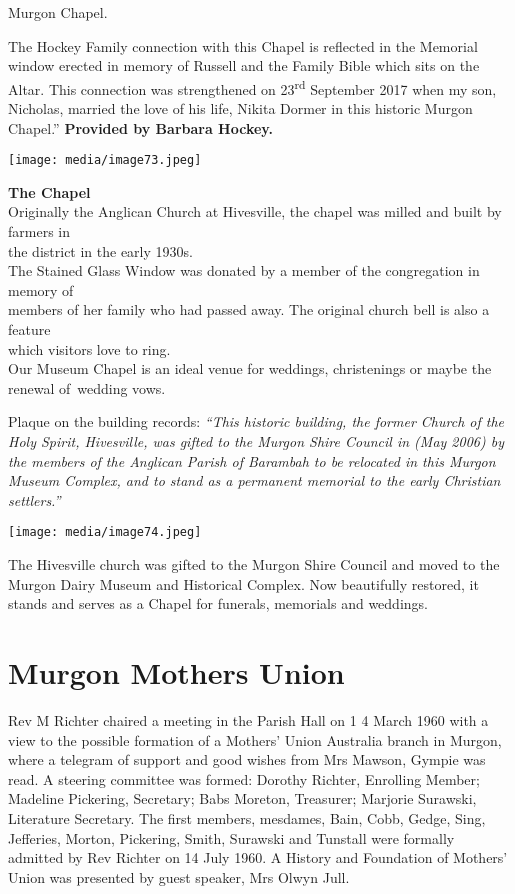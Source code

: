 Murgon Chapel.

The Hockey Family connection with this Chapel is reflected in the Memorial window erected in memory of Russell and the Family Bible which sits on the Altar. This connection was strengthened on 23\textsuperscript{rd} September 2017 when my son, Nicholas, married the love of his life, Nikita Dormer in this historic Murgon Chapel.'' \textbf{Provided by Barbara Hockey.}

\texttt{[image: media/image73.jpeg]}

\textbf{The Chapel}\\
Originally the Anglican Church at Hivesville, the chapel was milled and built by farmers in\\
the district in the early 1930s.\\
The Stained Glass Window was donated by a member of the congregation in memory of\\
members of her family who had passed away. The original church bell is also a feature\\
which visitors love to ring.\\
Our Museum Chapel is an ideal venue for weddings, christenings or maybe the renewal of~wedding vows.

Plaque on the building records: \emph{``This historic building, the former Church of the Holy Spirit, Hivesville, was gifted to the Murgon Shire Council in (May 2006) by the members of the Anglican Parish of Barambah to be relocated in this Murgon Museum Complex, and to stand as a permanent memorial to the early Christian settlers.''}

\texttt{[image: media/image74.jpeg]}

The Hivesville church was gifted to the Murgon Shire Council and moved to the Murgon Dairy Museum and Historical Complex. Now beautifully restored, it stands and serves as a Chapel for funerals, memorials and weddings.

\hypertarget{murgon-mothers-union}{%
\section{Murgon Mothers Union}\label{murgon-mothers-union}}

Rev M Richter chaired a meeting in the Parish Hall on 1 4 March 1960 with a view to the possible formation of a Mothers' Union Australia branch in Murgon, where a telegram of support and good wishes from Mrs Mawson, Gympie was read. A steering committee was formed: Dorothy Richter, Enrolling Member; Madeline Pickering, Secretary; Babs Moreton, Treasurer; Marjorie Surawski, Literature Secretary. The first members, mesdames, Bain, Cobb, Gedge, Sing, Jefferies, Morton, Pickering, Smith, Surawski and Tunstall were formally admitted by Rev Richter on 14 July 1960. A History and Foundation of Mothers' Union was presented by guest speaker, Mrs Olwyn Jull.

